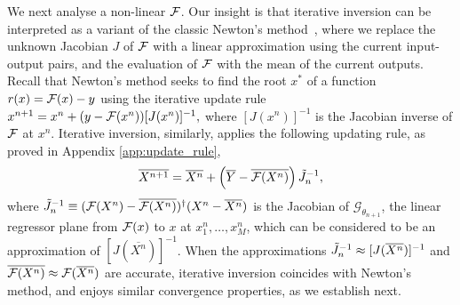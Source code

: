 \documentclass[nohyperref]{article}
\begin{document}
We next analyse a non-linear $\mathcal{F}$. Our insight is that iterative inversion can be interpreted as a variant of the classic Newton's method~\citep{ortega2000iterative}, where we replace the unknown Jacobian $J$ of $\mathcal{F}$ with a linear approximation using the current input-output pairs, and the evaluation of $\mathcal{F}$ with the mean of the current outputs.
Recall that Newton's method seeks to find the root $x^*$ of a function $r(x)=\mathcal{F}(x)-y$ using the iterative update rule
$
    x^{n+1}=x^n+(y-\mathcal{F}(x^n))[J(x^n)]^{-1},
$
where $[J(x^n)]^{-1}$ is the Jacobian inverse of $\mathcal{F}$ at $x^n$.
Iterative inversion, similarly, applies the following updating rule, as proved in Appendix \ref{app:update_rule},
\begin{equation}\label{eq:update_rule}
    \overline{X^{n+1}}=\overline{X^n} + \left(\overline{Y}-\overline{\mathcal{F}(X^n)}\right) \Tilde{J}^{-1}_{n} ,
\end{equation}
where $\Tilde{J}^{-1}_{n}\equiv(\mathcal{F}(X^n)-\overline{\mathcal{F}(X^n)})^{\dagger}(X^n-\overline{X^n})$ is the Jacobian of $\mathcal{G}_{\theta_{n+1}}$, the linear regressor plane from $\mathcal{F}(x)$ to $x$ at $x_1^n,\dots,x_M^n$, which can be considered to be an approximation of $[J(\overline{X^n})]^{-1}$. 
When the approximations $\Tilde{J}^{-1}_n\approx   [J(\overline{X^n})]^{-1}$ and $\overline{\mathcal{F}(X^n)}\approx \mathcal{F}(\overline{X^n})$ are accurate, iterative inversion coincides with Newton's method, and enjoys similar convergence properties, as we establish next. 
\end{document}
